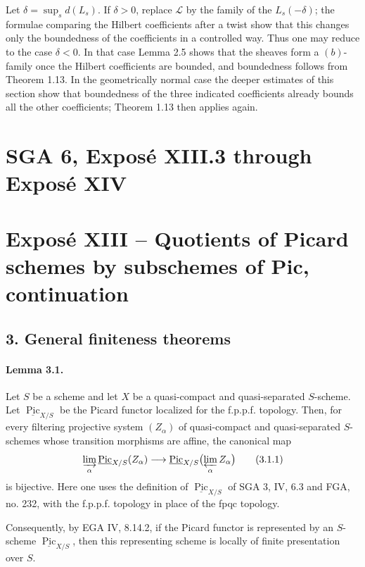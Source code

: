 \documentclass[11pt]{article}
\theoremstyle{plain}
\theoremstyle{definition}
\theoremstyle{remark}
\DeclareMathOperator{\Pic}{Pic}
\newcommand{\longto}{\longrightarrow}
\begin{document}
Let $\delta=\sup_s d(L_s)$. If $\delta>0$, replace $\mathscr L$ by the family of the $L_s(-\delta)$; the formulae comparing the Hilbert coefficients after a twist show that this changes only the boundedness of the coefficients in a controlled way. Thus one may reduce to the case $\delta<0$. In that case Lemma 2.5 shows that the sheaves form a $(b)$-family once the Hilbert coefficients are bounded, and boundedness follows from Theorem 1.13. In the geometrically normal case the deeper estimates of this section show that boundedness of the three indicated coefficients already bounds all the other coefficients; Theorem 1.13 then applies again.


\clearpage
\section*{SGA 6, Exposé XIII.3 through Exposé XIV}

\section*{Exposé XIII -- Quotients of Picard schemes by subschemes of Pic, continuation}

\subsection*{3. General finiteness theorems}

\paragraph{Lemma 3.1.}
Let $S$ be a scheme and let $X$ be a quasi-compact and quasi-separated $S$-scheme. Let $\underline{\Pic}_{X/S}$ be the Picard functor localized for the f.p.p.f. topology. Then, for every filtering projective system $(Z_\alpha)$ of quasi-compact and quasi-separated $S$-schemes whose transition morphisms are affine, the canonical map
\[
\varinjlim_\alpha \underline{\Pic}_{X/S}(Z_\alpha)
   \longto
\underline{\Pic}_{X/S}\bigl(\varprojlim_\alpha Z_\alpha\bigr)
\tag{3.1.1}
\]
is bijective. Here one uses the definition of $\underline{\Pic}_{X/S}$ of SGA 3, IV, 6.3 and FGA, no. 232, with the f.p.p.f. topology in place of the fpqc topology.

Consequently, by EGA IV, 8.14.2, if the Picard functor is represented by an $S$-scheme $\underline{\Pic}_{X/S}$, then this representing scheme is locally of finite presentation over $S$.
\end{document}
